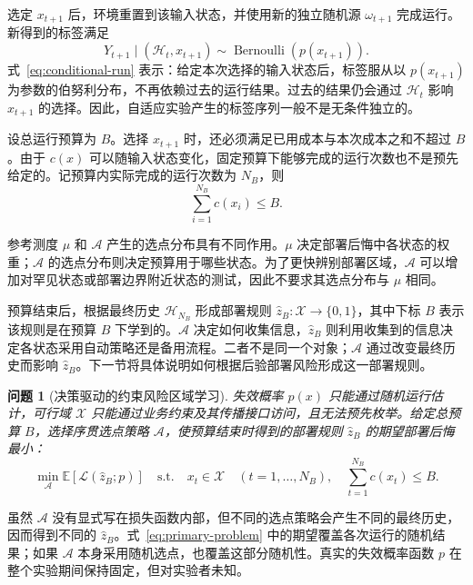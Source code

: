 \documentclass[UTF8,11pt,a4paper,fontset=none]{ctexart}
\newtheorem{problem}{问题}
\newcommand{\X}{\mathcal X}
\newcommand{\Hh}{\mathcal H}
\newcommand{\Aacq}{\mathcal A}
\newcommand{\E}{\mathbb E}
\newcommand{\1}{\mathbf 1}
\begin{document}
选定 $x_{t+1}$ 后，环境重置到该输入状态，并使用新的独立随机源 $\omega_{t+1}$ 完成运行。新得到的标签满足
\begin{equation}
  Y_{t+1}\mid(\Hh_t,x_{t+1})
  \sim \operatorname{Bernoulli}\!\left(p(x_{t+1})\right).
  \label{eq:conditional-run}
\end{equation}
式~\eqref{eq:conditional-run} 表示：给定本次选择的输入状态后，标签服从以 $p(x_{t+1})$ 为参数的伯努利分布，不再依赖过去的运行结果。过去的结果仍会通过 $\Hh_t$ 影响 $x_{t+1}$ 的选择。因此，自适应实验产生的标签序列一般不是无条件独立的。

设总运行预算为 $B$。选择 $x_{t+1}$ 时，还必须满足已用成本与本次成本之和不超过 $B$。由于 $c(x)$ 可以随输入状态变化，固定预算下能够完成的运行次数也不是预先给定的。记预算内实际完成的运行次数为 $N_B$，则
\begin{equation}
  \sum_{i=1}^{N_B}c(x_i)\leq B.
\end{equation}

参考测度 $\mu$ 和 $\Aacq$ 产生的选点分布具有不同作用。$\mu$ 决定部署后悔中各状态的权重；$\Aacq$ 的选点分布则决定预算用于哪些状态。为了更快辨别部署区域，$\Aacq$ 可以增加对罕见状态或部署边界附近状态的测试，因此不要求其选点分布与 $\mu$ 相同。

预算结束后，根据最终历史 $\Hh_{N_B}$ 形成部署规则 $\widehat z_B:\X\to\{0,1\}$，其中下标 $B$ 表示该规则是在预算 $B$ 下学到的。$\Aacq$ 决定如何收集信息，$\widehat z_B$ 则利用收集到的信息决定各状态采用自动策略还是备用流程。二者不是同一个对象；$\Aacq$ 通过改变最终历史而影响 $\widehat z_B$。下一节将具体说明如何根据后验部署风险形成这一部署规则。

\begin{problem}[决策驱动的约束风险区域学习]
失效概率 $p(x)$ 只能通过随机运行估计，可行域 $\X$ 只能通过业务约束及其传播接口访问，且无法预先枚举。给定总预算 $B$，选择序贯选点策略 $\Aacq$，使预算结束时得到的部署规则 $\widehat z_B$ 的期望部署后悔最小：
\begin{equation}
  \min_{\Aacq}
  \E\!\left[\mathcal L(\widehat z_B;p)\right]
  \quad\text{s.t.}\quad
  x_t\in\X\quad(t=1,\ldots,N_B),
  \quad \sum_{t=1}^{N_B}c(x_t)\leq B.
  \label{eq:primary-problem}
\end{equation}
\end{problem}

虽然 $\Aacq$ 没有显式写在损失函数内部，但不同的选点策略会产生不同的最终历史，因而得到不同的 $\widehat z_B$。式~\eqref{eq:primary-problem} 中的期望覆盖各次运行的随机结果；如果 $\Aacq$ 本身采用随机选点，也覆盖这部分随机性。真实的失效概率函数 $p$ 在整个实验期间保持固定，但对实验者未知。
\end{document}
